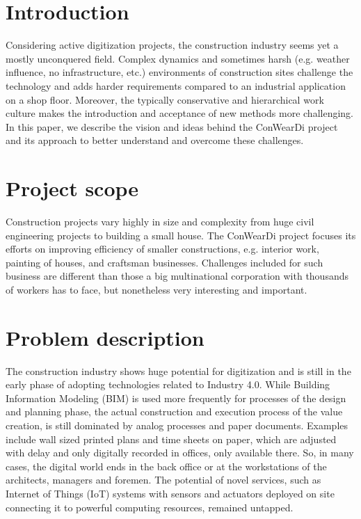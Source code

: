 \section{Introduction}
Considering active digitization projects, the construction industry seems yet a mostly unconquered field.
Complex dynamics and sometimes harsh (e.g. weather influence, no infrastructure, etc.) environments of construction sites challenge the technology and adds harder requirements compared to an industrial application on a shop floor. 
Moreover, the typically conservative and hierarchical work culture makes the introduction and acceptance of new methods more challenging. In this paper, we describe the vision and ideas behind the ConWearDi project and its approach to better understand and overcome these challenges.

\section{Project scope}
Construction projects vary highly in size and complexity from huge civil engineering projects to building a small house. 
The ConWearDi project focuses its efforts on improving efficiency of smaller constructions, e.g. interior work, painting of houses, and craftsman businesses.
Challenges included for such business are different than those a big multinational corporation with thousands of workers has to face, but nonetheless very interesting and important.

\section{Problem description}
The construction industry shows huge potential for digitization and is still in the early phase of adopting technologies related to Industry 4.0. 
While Building Information Modeling (BIM) is used more frequently for processes of the design and planning phase, the actual construction and execution process of the value creation, is still dominated by analog processes and paper documents. 
Examples include wall sized printed plans and time sheets on paper, which are adjusted with delay and only digitally recorded in offices, only available there. 
So, in many cases, the digital world ends in the back office or at the workstations of the architects, managers and foremen. 
The potential of novel services, such as Internet of Things (IoT) systems with sensors and actuators deployed on site connecting it to powerful computing resources, remained untapped.

